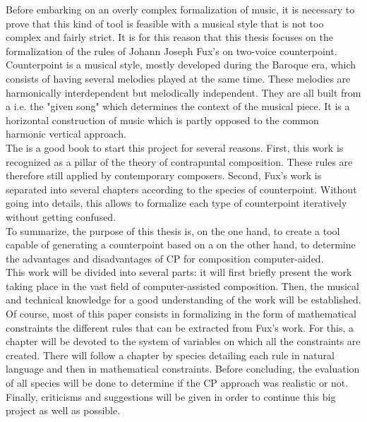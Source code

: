 Before embarking on an overly complex formalization of music, it is necessary to prove that this kind of tool is feasible with a musical style that is not too complex and fairly strict. It is for this reason that this thesis focuses on the formalization of the rules of Johann Joseph Fux's \parencite{IMSLPlatin} on two-voice counterpoint. Counterpoint is a musical style, mostly developed during the Baroque era, which consists of having several melodies played at the same time\parencite{CpSachs}. These melodies are harmonically interdependent but melodically independent\parencite{CpLaitz}. They are all built from a \cfcomma i.e. the "given song" which determines the context of the musical piece. It is a horizontal construction of music which is partly opposed to the common harmonic vertical approach.\\

The  is a good book to start this project for several reasons. First, this work is recognized as a pillar of the theory of contrapuntal composition. These rules are therefore still applied by contemporary composers. Second, Fux's work is separated into several chapters according to the species of counterpoint. Without going into details, this allows to formalize each type of counterpoint iteratively without getting confused.\\

To summarize, the purpose of this thesis is, on the one hand, to create a tool capable of generating a counterpoint based on a \cfcomma on the other hand, to determine the advantages and disadvantages of CP for composition computer-aided.\\

This work will be divided into several parts: it will first briefly present the work taking place in the vast field of computer-assisted composition. Then, the musical and technical knowledge for a good understanding of the work will be established. Of course, most of this paper consists in formalizing in the form of mathematical constraints the different rules that can be extracted from Fux's work. For this, a chapter will be devoted to the system of variables on which all the constraints are created. There will follow a chapter by species detailing each rule in natural language and then in mathematical constraints. Before concluding, the evaluation of all species will be done to determine if the CP approach was realistic or not. Finally, criticisms and suggestions will be given in order to continue this big project as well as possible.